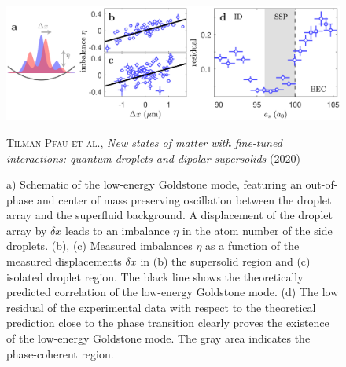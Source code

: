 \begin{figure}[H]
    \centering
    \includegraphics[width=1.0\textwidth]{IMAGE/goldstone_mode.png}\\
    \caption{
      a) Schematic of the low-energy Goldstone mode, featuring an out-of-phase
and center of mass preserving oscillation between the droplet array and the superfluid
background. A displacement of the droplet array by $\delta x$ leads to an imbalance $\eta$ in the
atom number of the side droplets. (b), (c) Measured imbalances $\eta$ as a function of the
measured displacements $\delta x$ in (b) the supersolid region and (c) isolated droplet region.
The black line shows the theoretically predicted correlation of the low-energy Goldstone
mode. (d) The low residual of the experimental data with respect to the theoretical
prediction close to the phase transition clearly proves the existence of the low-energy
Goldstone mode. The gray area indicates the phase-coherent region.
      }
    \textsc{Tilman Pfau et al.}, \emph{New states of matter with fine-tuned interactions: quantum droplets and dipolar supersolids} (2020)
    \label{fig:goldstone_mode}
\end{figure}

